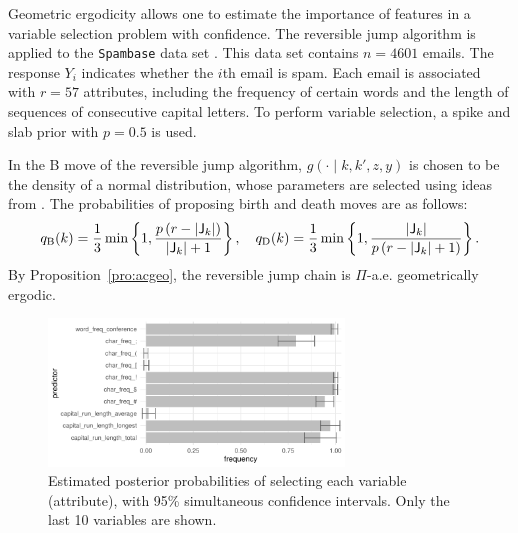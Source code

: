 \documentclass[12pt]{article}
\begin{document}
Geometric ergodicity allows one to estimate the importance of features in a variable selection problem with confidence.
The reversible jump algorithm is applied to the \verb|Spambase| data set \citep{misc_spambase_94}.
This data set contains $n = 4601$ emails. 
The response $Y_i$ indicates whether the $i$th email is spam.
Each email is associated with $r = 57$ attributes, including the frequency of certain words and the length of sequences of consecutive capital letters.
To perform variable selection, a spike and slab prior with $p = 0.5$ is used.

In the B move of the reversible jump algorithm, $g(\cdot \mid k, k', z, y)$ is chosen to be the density of a normal distribution, whose parameters are selected using ideas from \cite{brooks2003efficient}.
The probabilities of proposing birth and death moves are as follows:
\[
q_{\scriptsize\mbox{B}}(k) = \frac{1}{3} \min \left\{ 1, \frac{p \, (r - |\mathsf{J}_k|)}{|\mathsf{J}_k| + 1} \right\}, \quad q_{\scriptsize\mbox{D}}(k) = \frac{1}{3} \min \left\{ 1, \frac{|\mathsf{J}_k|}{p \, (r - |\mathsf{J}_k| + 1)} \right\}.
\]
By Proposition~\ref{pro:acgeo}, the reversible jump chain is $\Pi$-a.e. geometrically ergodic.

\begin{figure}
	\centering
	\includegraphics[width=0.7\textwidth]{probit.subset}
	\caption{Estimated posterior probabilities of selecting each variable (attribute), with 95\% simultaneous confidence intervals.
		Only the last 10 variables are shown.
	} \label{fig:probit}
\end{figure}
\end{document}

